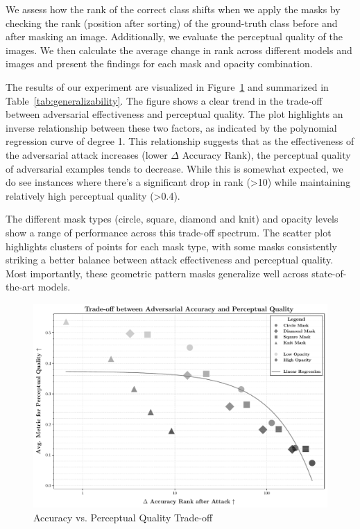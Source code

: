 \documentclass[a4paper, oneside]{discothesis}
\begin{document}
We assess how the rank of the correct class shifts when we apply the masks by checking the rank (position after sorting) of the ground-truth class before and after masking an image. Additionally, we evaluate the perceptual quality of the images. We then calculate the average change in rank across different models and images and present the findings for each mask and opacity combination. 

The results of our experiment are visualized in Figure~\ref{fig:accpercept} and summarized in Table~\ref{tab:generalizability}. The figure shows a clear trend in the trade-off between adversarial effectiveness and perceptual quality. The plot highlights an inverse relationship between these two factors, as indicated by the polynomial regression curve of degree 1. This relationship suggests that as the effectiveness of the adversarial attack increases (lower $\Delta$ Accuracy Rank), the perceptual quality of adversarial examples tends to decrease. While this is somewhat expected, we do see instances where there's a significant drop in rank (>10) while maintaining relatively high perceptual quality (>0.4).

The different mask types (circle, square, diamond and knit) and opacity levels show a range of performance across this trade-off spectrum. The scatter plot highlights clusters of points for each mask type, with some masks consistently striking a better balance between attack effectiveness and perceptual quality. Most importantly, these geometric pattern masks generalize well across state-of-the-art models.

\begin{figure}
	\centering
	\includegraphics[width=1\columnwidth]{figures/eval_cls_generalizability.pdf}
	\caption{Accuracy vs. Perceptual Quality Trade-off}
	\label{fig:accpercept}
\end{figure}
\end{document}
